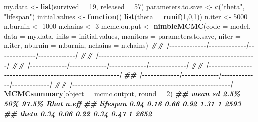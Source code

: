 \documentclass[
  12pt,
]{krantz}
\newenvironment{Shaded}{\begin{snugshade}}{\end{snugshade}}
\newcommand{\AttributeTok}[1]{\textcolor[rgb]{0.13,0.29,0.53}{#1}}
\newcommand{\ControlFlowTok}[1]{\textcolor[rgb]{0.13,0.29,0.53}{\textbf{#1}}}
\newcommand{\DecValTok}[1]{\textcolor[rgb]{0.00,0.00,0.81}{#1}}
\newcommand{\DocumentationTok}[1]{\textcolor[rgb]{0.56,0.35,0.01}{\textbf{\textit{#1}}}}
\newcommand{\FunctionTok}[1]{\textcolor[rgb]{0.13,0.29,0.53}{\textbf{#1}}}
\newcommand{\NormalTok}[1]{#1}
\newcommand{\OtherTok}[1]{\textcolor[rgb]{0.56,0.35,0.01}{#1}}
\newcommand{\StringTok}[1]{\textcolor[rgb]{0.31,0.60,0.02}{#1}}
\begin{document}
\begin{Shaded}
\begin{Highlighting}[]
\NormalTok{my.data }\OtherTok{\textless{}{-}} \FunctionTok{list}\NormalTok{(}\AttributeTok{survived =} \DecValTok{19}\NormalTok{, }\AttributeTok{released =} \DecValTok{57}\NormalTok{)}
\NormalTok{parameters.to.save }\OtherTok{\textless{}{-}} \FunctionTok{c}\NormalTok{(}\StringTok{"theta"}\NormalTok{, }\StringTok{"lifespan"}\NormalTok{)}
\NormalTok{initial.values }\OtherTok{\textless{}{-}} \ControlFlowTok{function}\NormalTok{() }\FunctionTok{list}\NormalTok{(}\AttributeTok{theta =} \FunctionTok{runif}\NormalTok{(}\DecValTok{1}\NormalTok{,}\DecValTok{0}\NormalTok{,}\DecValTok{1}\NormalTok{))}
\NormalTok{n.iter }\OtherTok{\textless{}{-}} \DecValTok{5000}
\NormalTok{n.burnin }\OtherTok{\textless{}{-}} \DecValTok{1000}
\NormalTok{n.chains }\OtherTok{\textless{}{-}} \DecValTok{3}
\NormalTok{mcmc.output }\OtherTok{\textless{}{-}} \FunctionTok{nimbleMCMC}\NormalTok{(}\AttributeTok{code =}\NormalTok{ model,}
                          \AttributeTok{data =}\NormalTok{ my.data,}
                          \AttributeTok{inits =}\NormalTok{ initial.values,}
                          \AttributeTok{monitors =}\NormalTok{ parameters.to.save,}
                          \AttributeTok{niter =}\NormalTok{ n.iter,}
                          \AttributeTok{nburnin =}\NormalTok{ n.burnin,}
                          \AttributeTok{nchains =}\NormalTok{ n.chains)}
\DocumentationTok{\#\# |{-}{-}{-}{-}{-}{-}{-}{-}{-}{-}{-}{-}{-}|{-}{-}{-}{-}{-}{-}{-}{-}{-}{-}{-}{-}{-}|{-}{-}{-}{-}{-}{-}{-}{-}{-}{-}{-}{-}{-}|{-}{-}{-}{-}{-}{-}{-}{-}{-}{-}{-}{-}{-}|}
\DocumentationTok{\#\# |{-}{-}{-}{-}{-}{-}{-}{-}{-}{-}{-}{-}{-}{-}{-}{-}{-}{-}{-}{-}{-}{-}{-}{-}{-}{-}{-}{-}{-}{-}{-}{-}{-}{-}{-}{-}{-}{-}{-}{-}{-}{-}{-}{-}{-}{-}{-}{-}{-}{-}{-}{-}{-}{-}{-}|}
\DocumentationTok{\#\# |{-}{-}{-}{-}{-}{-}{-}{-}{-}{-}{-}{-}{-}|{-}{-}{-}{-}{-}{-}{-}{-}{-}{-}{-}{-}{-}|{-}{-}{-}{-}{-}{-}{-}{-}{-}{-}{-}{-}{-}|{-}{-}{-}{-}{-}{-}{-}{-}{-}{-}{-}{-}{-}|}
\DocumentationTok{\#\# |{-}{-}{-}{-}{-}{-}{-}{-}{-}{-}{-}{-}{-}{-}{-}{-}{-}{-}{-}{-}{-}{-}{-}{-}{-}{-}{-}{-}{-}{-}{-}{-}{-}{-}{-}{-}{-}{-}{-}{-}{-}{-}{-}{-}{-}{-}{-}{-}{-}{-}{-}{-}{-}{-}{-}|}
\DocumentationTok{\#\# |{-}{-}{-}{-}{-}{-}{-}{-}{-}{-}{-}{-}{-}|{-}{-}{-}{-}{-}{-}{-}{-}{-}{-}{-}{-}{-}|{-}{-}{-}{-}{-}{-}{-}{-}{-}{-}{-}{-}{-}|{-}{-}{-}{-}{-}{-}{-}{-}{-}{-}{-}{-}{-}|}
\DocumentationTok{\#\# |{-}{-}{-}{-}{-}{-}{-}{-}{-}{-}{-}{-}{-}{-}{-}{-}{-}{-}{-}{-}{-}{-}{-}{-}{-}{-}{-}{-}{-}{-}{-}{-}{-}{-}{-}{-}{-}{-}{-}{-}{-}{-}{-}{-}{-}{-}{-}{-}{-}{-}{-}{-}{-}{-}{-}|}
\FunctionTok{MCMCsummary}\NormalTok{(}\AttributeTok{object =}\NormalTok{ mcmc.output, }\AttributeTok{round =} \DecValTok{2}\NormalTok{)}
\DocumentationTok{\#\#          mean   sd 2.5\%  50\% 97.5\% Rhat n.eff}
\DocumentationTok{\#\# lifespan 0.94 0.16 0.66 0.92  1.31    1  2593}
\DocumentationTok{\#\# theta    0.34 0.06 0.22 0.34  0.47    1  2652}
\end{Highlighting}
\end{Shaded}
\end{document}
